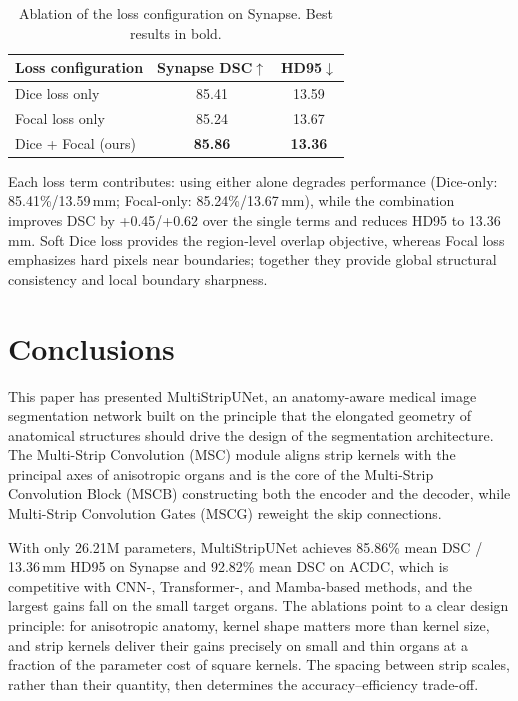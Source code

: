 \documentclass{llncs}
\begin{document}
\begin{table}[!htbp]
\centering
\footnotesize
\caption{Ablation of the loss configuration on Synapse. Best results in bold.}
\label{table_loss_ablation}
\begin{tabular}{l|cc}
\hline
Loss configuration & Synapse DSC$\uparrow$ & HD95$\downarrow$ \\
\hline
Dice loss only            & 85.41 & 13.59 \\
Focal loss only           & 85.24 & 13.67 \\
Dice + Focal (ours)       & \textbf{85.86} & \textbf{13.36} \\
\hline
\end{tabular}
\end{table}

Each loss term contributes: using either alone degrades performance (Dice-only: 85.41\%/13.59\,mm; Focal-only: 85.24\%/13.67\,mm), while the combination improves DSC by +0.45/+0.62 over the single terms and reduces HD95 to 13.36\,mm. Soft Dice loss provides the region-level overlap objective, whereas Focal loss emphasizes hard pixels near boundaries; together they provide global structural consistency and local boundary sharpness.

\section{Conclusions}

This paper has presented MultiStripUNet, an anatomy-aware medical image segmentation network built on the principle that the elongated geometry of anatomical structures should drive the design of the segmentation architecture. The Multi-Strip Convolution (MSC) module aligns strip kernels with the principal axes of anisotropic organs and is the core of the Multi-Strip Convolution Block (MSCB) constructing both the encoder and the decoder, while Multi-Strip Convolution Gates (MSCG) reweight the skip connections. 

With only 26.21M parameters, MultiStripUNet achieves 85.86\% mean DSC / 13.36\,mm HD95 on Synapse and 92.82\% mean DSC on ACDC, which is competitive with CNN-, Transformer-, and Mamba-based methods, and the largest gains fall on the small target organs. The ablations point to a clear design principle: for anisotropic anatomy, kernel shape matters more than kernel size, and strip kernels deliver their gains precisely on small and thin organs at a fraction of the parameter cost of square kernels. The spacing between strip scales, rather than their quantity, then determines the accuracy--efficiency trade-off.
\end{document}

